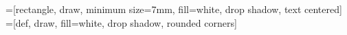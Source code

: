 

\usetikzlibrary{calc,shapes,arrows,shadows,chains,backgrounds,decorations.markings}

=[rectangle, draw, minimum size=7mm, fill=white, drop shadow, text centered]
=[def, draw, fill=white, drop shadow, rounded corners]

\usepackage[english]{babel}